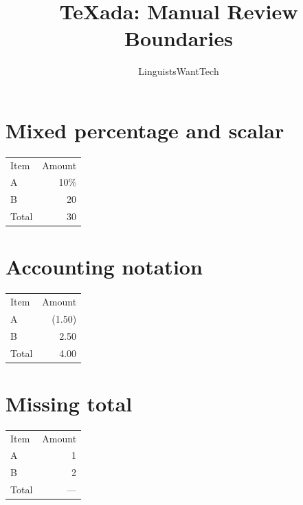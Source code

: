 \documentclass{article}
\title{TeXada: Manual Review Boundaries}
\author{LinguistsWantTech}
\date{}
\begin{document}
\maketitle
\section{Mixed percentage and scalar}
\begin{tabular}{lr}
Item & Amount \\
A & 10\% \\
B & 20 \\
Total & 30 \\
\end{tabular}
\section{Accounting notation}
\begin{tabular}{lr}
Item & Amount \\
A & (1.50) \\
B & 2.50 \\
Total & 4.00 \\
\end{tabular}
\section{Missing total}
\begin{tabular}{lr}
Item & Amount \\
A & 1 \\
B & 2 \\
Total & --- \\
\end{tabular}
\end{document}
